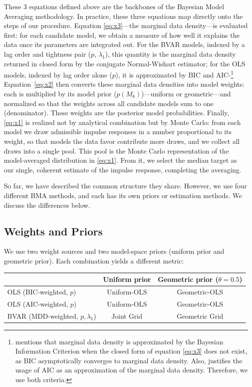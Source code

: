 \documentclass[12pt, a4paper]{article}
\begin{document}
These 3 equations defined above are the backbones of the Bayesian Model Averaging methodology. In practice, these three equations map directly onto the steps of our procedure. Equation \eqref{eq:x3}---the marginal data density---is evaluated first: for each candidate model, we obtain a measure of how well it explains the data once its parameters are integrated out. For the BVAR models, indexed by a lag order and tightness pair ($p$, $\lambda_1$), this quantity is the marginal data density returned in closed form by the conjugate Normal-Wishart estimator; for the OLS models, indexed by lag order alone ($p$), it is approximated by BIC and AIC-\footnote{\citet[chapt. 3.7]{steelModelAveragingIts2020} mentions that marginal data density is approximated by the Bayesian Information Criterion when the closed form of equation \eqref{eq:x3} does not exist, as BIC asymptotically converges to marginal data density. Also, \citet{burnhamModelSelectionMultimodel2002} justifies the usage of AIC as an approximation of the marginal data density. Therefore, we use both criteria.} Equation~\eqref{eq:x2} then converts these marginal data densities into model weights: each is multiplied by its model prior ($p(M_k)$)---uniform or geometric---and normalized so that the weights across all candidate models sum to one (denominator). These weights are the posterior model probabilities. Finally, \eqref{eq:x1} is realized not by analytical combination but by Monte Carlo: from each model we draw admissible impulse responses in a number proportional to its weight, so that models the data favor contribute more draws, and we collect all draws into a single pool. This pool is the Monte Carlo representation of the model-averaged distribution in \eqref{eq:x1}. From it, we select the median target as our single, coherent estimate of the impulse response, completing the averaging.

So far, we have described the common structure they share. However, we use four different BMA methods, and each has its own priors or estimation methods. We discuss the differences below.

\subsection*{Weights and Priors}

We use two weight sources and two model-space priors (uniform prior and geometric prior). Each combination yields a different metric:

\begin{table}[h]
\centering
\begin{tabular}{lcc}
\toprule
 & \textbf{Uniform prior} & \textbf{Geometric prior ($\theta = 0.5$)} \\
\midrule
OLS (BIC-weighted, $p$) & Uniform-OLS & Geometric-OLS \\
OLS (AIC-weighted, $p$) & Uniform-OLS & Geometric-OLS \\
BVAR (MDD-weighted, $p, \lambda_1$) & Joint Grid & Geometric Grid \\
\bottomrule
\end{tabular}
\end{table}
\end{document}
